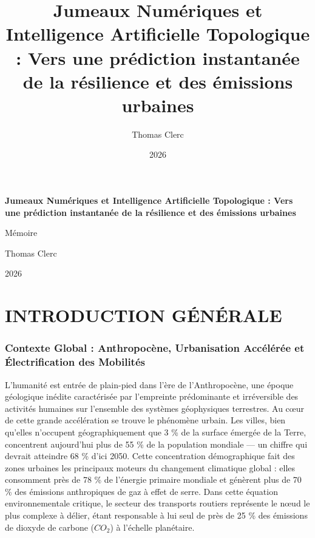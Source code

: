 \documentclass[10pt, a4paper]{article}
\title{Jumeaux Numériques et Intelligence Artificielle Topologique :
Vers une prédiction instantanée de la résilience et des émissions
urbaines}
\author{Thomas Clerc}
\date{2026}
\begin{document}
\begin{titlepage}
\centering
\vspace*{2cm}
{\Huge\bfseries Jumeaux Numériques et Intelligence Artificielle
Topologique : Vers une prédiction instantanée de la résilience et des
émissions urbaines\par}
\vspace{1.5cm}
{\Large Mémoire\par}
\vspace{1cm}
{\large Thomas Clerc\par}
\vspace{0.5cm}
{\large 2026\par}
\vfill
\end{titlepage}

\tableofcontents
\newpage

\newpage

\section{INTRODUCTION GÉNÉRALE}\label{introduction-guxe9nuxe9rale}

\subsubsection{Contexte Global : Anthropocène, Urbanisation Accélérée et
Électrification des
Mobilités}\label{contexte-global-anthropocuxe8ne-urbanisation-accuxe9luxe9ruxe9e-et-uxe9lectrification-des-mobilituxe9s}

L'humanité est entrée de plain-pied dans l'ère de l'Anthropocène, une
époque géologique inédite caractérisée par l'empreinte prédominante et
irréversible des activités humaines sur l'ensemble des systèmes
géophysiques terrestres. Au cœur de cette grande accélération se trouve
le phénomène urbain. Les villes, bien qu'elles n'occupent
géographiquement que 3 \% de la surface émergée de la Terre, concentrent
aujourd'hui plus de 55 \% de la population mondiale --- un chiffre qui
devrait atteindre 68 \% d'ici 2050. Cette concentration démographique
fait des zones urbaines les principaux moteurs du changement climatique
global : elles consomment près de 78 \% de l'énergie primaire mondiale
et génèrent plus de 70 \% des émissions anthropiques de gaz à effet de
serre. Dans cette équation environnementale critique, le secteur des
transports routiers représente le nœud le plus complexe à délier, étant
responsable à lui seul de près de 25 \% des émissions de dioxyde de
carbone (\(CO_2\)) à l'échelle planétaire.
\end{document}
